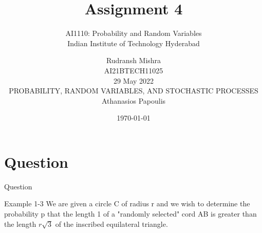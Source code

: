 \documentclass{beamer}
\title{Assignment 4}
\subtitle{\Large AI1110: Probability and Random Variables \\ \large Indian Institute of Technology Hyderabad}
\author{Rudransh Mishra \\ \normalsize AI21BTECH11025 \\ \vspace*{20pt} \normalsize  29 May 2022 \\ \vspace*{20pt} PROBABILITY, RANDOM VARIABLES, AND STOCHASTIC PROCESSES\\ \normalsize Athanasios Papoulis}
\date{\today}
\begin{document}
\begin{frame}
    \titlepage 
\end{frame}

\logo{}


\section{Question}
\begin{frame}{Question}
    \begin{block}{Example 1-3}
        We are given a circle C of radius r and we wish to determine the             probability p that the length 1 of a "randomly selected" cord AB is         greater than the length $r \sqrt 3 $ of the inscribed equilateral           triangle.
    \end{block}
\end{frame}
\end{document}
